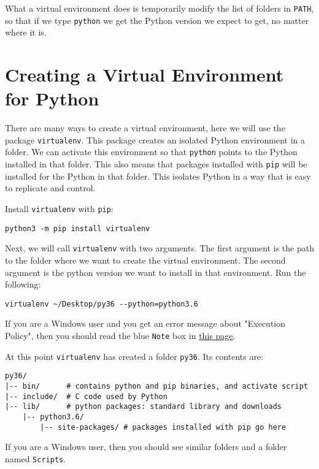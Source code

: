 \documentclass[12pt, a4paper]{article}
\begin{document}
What a virtual environment does is temporarily modify the list of folders in \texttt{PATH}, so that if we type \texttt{python} we get the Python version we expect to get, no matter where it is.
\section*{Creating a Virtual Environment for Python}
\label{sec:org301cbeb}
There are many ways to create a virtual environment, here we will use the package \texttt{virtualenv}.
This package creates an isolated Python environment in a folder.
We can activate this environment so that \texttt{python} points to the Python installed in that folder.
This also means that packages installed with \texttt{pip} will be installed for the Python in that folder.
This isolates Python in a way that is easy to replicate and control.

Install \texttt{virtualenv} with \texttt{pip}:
\lstset{language=bash,label= ,caption= ,captionpos=b,firstnumber=1,numbers=left,style=bash}
\begin{lstlisting}
python3 -m pip install virtualenv
\end{lstlisting}
Next, we will call \texttt{virtualenv} with two arguments.
The first argument is the path to the folder where we want to create the virtual environment.
The second argument is the python version we want to install in that environment.
Run the following:
\lstset{language=bash,label= ,caption= ,captionpos=b,firstnumber=1,numbers=left,style=bash}
\begin{lstlisting}
virtualenv ~/Desktop/py36 --python=python3.6
\end{lstlisting}
If you are a Windows user and you get an error message about "Execution Policy", then you should read the blue \texttt{Note} box in \href{https://virtualenv.pypa.io/en/latest/userguide/}{this page}.

At this point \texttt{virtualenv} has created a folder \texttt{py36}. Its contents are:
\lstset{language=bash,label= ,caption= ,captionpos=b,firstnumber=1,numbers=left,style=bash}
\begin{lstlisting}
py36/
|-- bin/      # contains python and pip binaries, and activate script
|-- include/  # C code used by Python
|-- lib/      # python packages: standard library and downloads
    |-- python3.6/
        |-- site-packages/ # packages installed with pip go here
\end{lstlisting}
If you are a Windows user, then you should see similar folders and a folder named \texttt{Scripts}.
\end{document}
